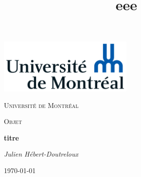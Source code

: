 \documentclass[french, babel]{article}
\title{eee}
\begin{document}
\begin{titlepage}
	\centering
	\includegraphics[width=0.5\textwidth]{Universite_de_Montreal_logo}\par\vspace{1cm}
	{\scshape\LARGE Université de Montréal\par}
	\vspace{1cm}
	{\scshape\Large Objet\par}
	\vspace{1.5cm}
	{\huge\bfseries titre \par}
	\vspace{2cm}
	{\Large\itshape Julien Hébert-Doutreloux\par}
	\vfill
	\vfill
	{\large \today\par}
\end{titlepage}
\end{document}
